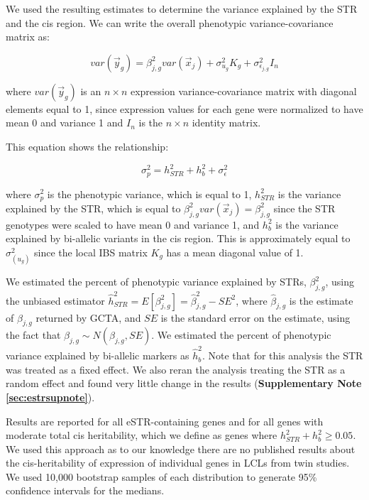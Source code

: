 We used the resulting estimates to determine the variance explained by the STR and the cis region. We can write the overall phenotypic variance-covariance matrix as:

\begin{equation}
var(\vec{y}_g) = \beta_{j,g}^2var(\vec{x}_j) + \sigma_{u_g}^2K_g + \sigma_{\epsilon_{j,g}}^2I_n
\end{equation}

where $var(\vec{y}_g)$ is an $n \times n$ expression variance-covariance matrix with diagonal elements equal to 1, since expression values for each gene were normalized to have mean 0 and variance 1 and $I_n$ is the $n \times n$ identity matrix.

This equation shows the relationship:

\begin{equation}
\sigma_p^2 = h_{STR}^2 + h_b^2 + \sigma_{\epsilon}^2
\end{equation}

where $\sigma_p^2$ is the phenotypic variance, which is equal to 1, $h_{STR}^2$ is the variance explained by the STR, which is equal to $\beta_{j,g}^2var(\vec{x}_j)=\beta_{j,g}^2$ since the STR genotypes were scaled to have mean 0 and variance 1, and $h_b^2$ is the variance explained by bi-allelic variants in the cis region. This is approximately equal to $\sigma_(u_g)^2$ since the local IBS matrix $K_g$ has a mean diagonal value of 1.

We estimated the percent of phenotypic variance explained by STRs, $\beta_{j,g}^2$, using the unbiased estimator  $\hat{h}_{STR}^2 = E[\beta_{j,g}^2] = \hat{\beta}_{j,g}^2 - SE^2$, where $\hat{\beta}_{j,g}$ is the estimate of  $\beta_{j,g}$ returned by GCTA, and $SE$ is the standard error on the estimate, using the fact that $\beta_{j,g} \sim N(\beta_{j,g}, SE)$. We estimated the percent of phenotypic variance explained by bi-allelic markers as $\hat{h}_b^2$. Note that for this analysis the STR was treated as a fixed effect. We also reran the analysis treating the STR as a random effect and found very little change in the results (\textbf{Supplementary Note \ref{sec:estrsupnote}}).

Results are reported for all eSTR-containing genes and for all genes with moderate total cis heritability, which we define as genes where $h_{STR}^2 + h_b^2 \geq 0.05$. We used this approach as to our knowledge there are no published results about the cis-heritability of expression of individual genes in LCLs from twin studies. We used 10,000 bootstrap samples of each distribution to generate 95\% confidence intervals for the medians.

